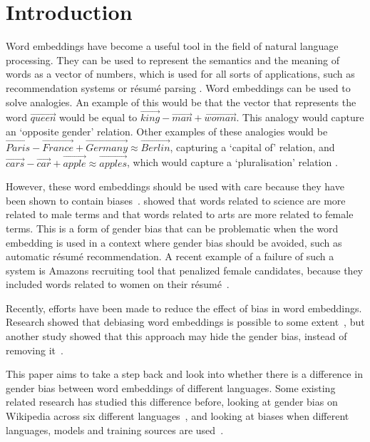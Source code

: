 \section{Introduction}\label{ch:introduction}
Word embeddings have become a useful tool in the field of natural language
processing. They can be used to represent the semantics and the meaning of
words as a vector of numbers, which is used for all sorts of applications, such as
recommendation systems \parencite{10.1145/3219819.3219885} or résumé
parsing \parencite{large-scale-hoang-2017, nasser2018convolutional}. Word
embeddings can be used to solve analogies. An example of this would be that the
vector that represents the word
$\overrightarrow{queen}$ would be equal to $\overrightarrow{king} -
\overrightarrow{man} +
\overrightarrow{woman}$. This analogy would capture an `opposite gender' relation.
Other examples of these analogies would be $\overrightarrow{Paris} -
\overrightarrow{France} + \overrightarrow{Germany} \approx \overrightarrow{Berlin}$,
capturing a `capital of' relation, and
$\overrightarrow{cars} - \overrightarrow{car} + \overrightarrow{apple} \approx
\overrightarrow{apples}$, which would capture a `pluralisation' relation \parencite{vylomova-etal-2016-take}.

However, these word embeddings should be used with care because they have been
shown to contain biases~\parencite{caliskan_2017_semantics_language_corpora}.
\textcite{caliskan_2017_semantics_language_corpora} showed
that words related to science are more related to male terms and that
words related to arts are more related to female terms. This is a form of gender bias
that can be problematic when the word embedding is used in a context where gender bias
should be avoided, such as automatic résumé recommendation. A recent example of a failure
of such a system is Amazons recruiting tool that penalized female candidates, because they
included words related to women on their résumé~\parencite{dastin_2018}.

Recently, efforts have been made to reduce the effect of bias in word embeddings.
Research showed that debiasing word embeddings
is possible to some extent~\parencite{bolukbasi_2016_quantifying_stereotypes}, but another
study showed that this approach may hide the
gender bias, instead of removing it~\parencite{gonen-goldberg-2019-lipstick-pig}.

This paper aims to take a step back and look into whether there is a difference in gender
bias between word embeddings of different languages. Some existing related research has
studied this difference before, looking at
gender bias on Wikipedia across six different languages~\parencite{2015arXiv150106307W},
and looking at biases when different languages, models and training
sources are used~\parencite{lauscher-glavas-2019-consistently}.

